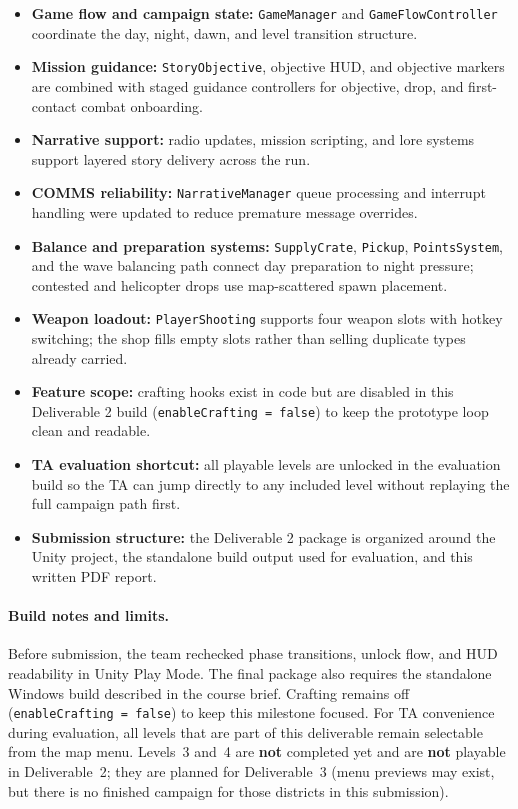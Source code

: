 \documentclass[11pt]{article}
\begin{document}
\begin{itemize}
    \item \textbf{Game flow and campaign state:} \texttt{GameManager} and \texttt{GameFlowController} coordinate the day, night, dawn, and level transition structure.
    \item \textbf{Mission guidance:} \texttt{StoryObjective}, objective HUD, and objective markers are combined with staged guidance controllers for objective, drop, and first-contact combat onboarding.
    \item \textbf{Narrative support:} radio updates, mission scripting, and lore systems support layered story delivery across the run.
    \item \textbf{COMMS reliability:} \texttt{NarrativeManager} queue processing and interrupt handling were updated to reduce premature message overrides.
    \item \textbf{Balance and preparation systems:} \texttt{SupplyCrate}, \texttt{Pickup}, \texttt{PointsSystem}, and the wave balancing path connect day preparation to night pressure; contested and helicopter drops use map-scattered spawn placement.
    \item \textbf{Weapon loadout:} \texttt{PlayerShooting} supports four weapon slots with hotkey switching; the shop fills empty slots rather than selling duplicate types already carried.
    \item \textbf{Feature scope:} crafting hooks exist in code but are disabled in this Deliverable 2 build (\texttt{enableCrafting = false}) to keep the prototype loop clean and readable.
    \item \textbf{TA evaluation shortcut:} all playable levels are unlocked in the evaluation build so the TA can jump directly to any included level without replaying the full campaign path first.
    \item \textbf{Submission structure:} the Deliverable 2 package is organized around the Unity project, the standalone build output used for evaluation, and this written PDF report.
\end{itemize}

\paragraph{Build notes and limits.}
Before submission, the team rechecked phase transitions, unlock flow, and HUD readability in Unity Play Mode. The final package also requires the standalone Windows build described in the course brief. Crafting remains off (\texttt{enableCrafting = false}) to keep this milestone focused. For TA convenience during evaluation, all levels that are part of this deliverable remain selectable from the map menu. Levels~3 and~4 are \textbf{not} completed yet and are \textbf{not} playable in Deliverable~2; they are planned for Deliverable~3 (menu previews may exist, but there is no finished campaign for those districts in this submission).
\end{document}
